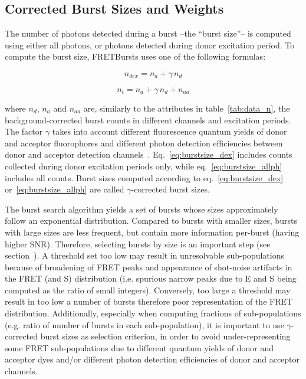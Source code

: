 \documentclass[10pt,letterpaper]{article}
\begin{document}
\subsection*{Corrected Burst Sizes and Weights}
\label{sec:burstsizeweights}

The number of photons detected during a burst --the ``burst size''--
is computed using either all photons, or photons detected
during donor excitation period. To compute the burst size, FRETBursts uses
one of the following formulas:

\begin{equation}
\label{eq:burstsize_dex}
n_{dex} = n_a + \gamma\,n_d
\end{equation}

\begin{equation}
\label{eq:burstsize_allph}
n_t = n_a + \gamma\,n_d + n_{aa}
\end{equation}

\noindent where $n_d$, $n_a$ and $n_{aa}$ are, similarly to the attributes
in table~\ref{tab:data_n}, the background-corrected
burst counts in different channels and excitation periods.
The factor $\gamma$ takes into account
different fluorescence quantum yields of donor and acceptor fluorophores and different
photon detection efficiencies between donor and acceptor detection
channels~\cite{Deniz_1999,Lee_2005}.
Eq.~\ref{eq:burstsize_dex} includes counts collected during donor excitation periods only,
while eq.~\ref{eq:burstsize_allph} includes all counts.
Burst sizes computed according to eq.~\ref{eq:burstsize_dex}
or~\ref{eq:burstsize_allph} are called $\gamma$-corrected burst sizes.

The burst search algorithm yields a set of bursts whose sizes
approximately follow an exponential distribution.
Compared to bursts with smaller sizes, bursts with large sizes are less frequent,
but contain more information per-burst (having higher SNR).
Therefore, selecting bursts by size is an important step (see section~).
A threshold set too low may result in unresolvable sub-populations
because of broadening of FRET peaks and appearance of shot-noise artifacts
in the FRET (and S) distribution (i.e. spurious narrow peaks due to E and S being
computed as the ratio of small integers).
Conversely, too large a threshold may result in too low a number of bursts
therefore poor representation of the FRET distribution.
Additionally, especially when computing fractions of sub-populations
(e.g. ratio of number of bursts in each sub-population),
it is important to use $\gamma$-corrected burst sizes as selection criterion,
in order to avoid under-representing some FRET sub-populations
due to different quantum yields of donor and acceptor dyes and/or
different photon detection efficiencies of donor and acceptor channels.
\end{document}
